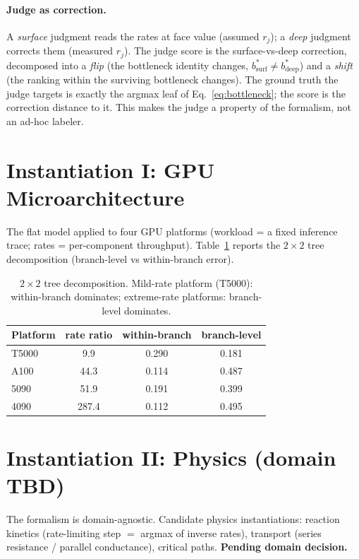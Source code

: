\documentclass[11pt]{article}
\begin{document}
\paragraph{Judge as correction.}
A \emph{surface} judgment reads the rates at face value (assumed $r_j$); a
\emph{deep} judgment corrects them (measured $r_j$). The judge score is the
surface-vs-deep correction, decomposed into a \emph{flip} (the bottleneck
identity changes, $b^{*}_{\mathrm{surf}} \neq b^{*}_{\mathrm{deep}}$) and a
\emph{shift} (the ranking within the surviving bottleneck changes). The
ground truth the judge targets is exactly the argmax leaf of
Eq.~\eqref{eq:bottleneck}; the score is the correction distance to it. This
makes the judge a property of the formalism, not an ad-hoc labeler.

\section{Instantiation I: GPU Microarchitecture}
\label{sec:gpu}
The flat model applied to four GPU platforms (workload = a fixed inference
trace; rates = per-component throughput). Table~\ref{tab:gpu} reports the
$2\times2$ tree decomposition (branch-level vs within-branch error).

\begin{table}[h]
\centering
\begin{tabular}{lccc}
\toprule
Platform & rate ratio & within-branch & branch-level \\
\midrule
T5000 & 9.9   & 0.290 & 0.181 \\
A100  & 44.3  & 0.114 & 0.487 \\
5090  & 51.9  & 0.191 & 0.399 \\
4090  & 287.4 & 0.112 & 0.495 \\
\bottomrule
\end{tabular}
\caption{$2\times2$ tree decomposition. Mild-rate platform (T5000):
within-branch dominates; extreme-rate platforms: branch-level dominates.}
\label{tab:gpu}
\end{table}


\section{Instantiation II: Physics (domain TBD)}
\label{sec:physics}
The formalism is domain-agnostic. Candidate physics instantiations:
reaction kinetics (rate-limiting step $=$ argmax of inverse rates), transport
(series resistance / parallel conductance), critical paths.
\textbf{Pending domain decision.}
\end{document}
